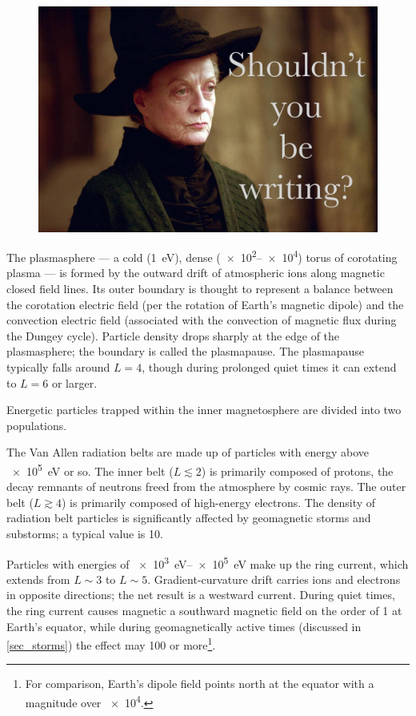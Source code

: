 \begin{figure}[!htb]
    \centering
    \includegraphics[width=\textwidth]{figures/placeholder.jpg}
    \caption[Inner Magnetosphere Cutaway]{
    }
    \label{fig_inner_magnetosphere}
\end{figure}

The plasmasphere --- a cold (\about\SI{1}{\eV}), dense (\SIrange{e2}{e4}{\percc}) torus of corotating plasma --- is formed by the outward drift of atmospheric ions along magnetic closed field lines. Its outer boundary is thought to represent a balance between the corotation electric field (per the rotation of Earth's magnetic dipole) and the convection electric field (associated with the convection of magnetic flux during the Dungey cycle). Particle density drops sharply at the edge of the plasmasphere; the boundary is called the plasmapause. The plasmapause typically falls around $L=4$, though during prolonged quiet times it can extend to $L=6$ or larger. 

Energetic particles trapped within the inner magnetosphere are divided into two populations. 

The Van Allen radiation belts are made up of particles with energy above \SI{e5}{\eV} or so. The inner belt ($L\lesssim2$) is primarily composed of protons, the decay remnants of neutrons freed from the atmosphere by cosmic rays. The outer belt ($L\gtrsim4$) is primarily composed of high-energy electrons. The density of radiation belt particles is significantly affected by geomagnetic storms and substorms; a typical value is \SI{10}{\percc}. 

Particles with energies of \SIrange{e3}{e5}{\eV} make up the ring current, which extends from $L\sim3$ to $L\sim5$. Gradient-curvature drift carries ions and electrons in opposite directions; the net result is a westward current. During quiet times, the ring current causes magnetic a southward magnetic field on the order of \SI{1}{\nT} at Earth's equator, while during geomagnetically active times (discussed in \cref{sec_storms}) the effect may \SI{100}{\nT} or more\footnote{For comparison, Earth's dipole field points north at the equator with a magnitude over \SI{e4}{\nT}. }. 

